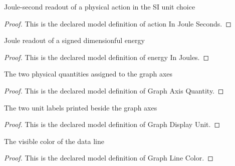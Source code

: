 \begin{definition}
  \label{def:physics:phyx-mini-0499:phyxminiproblems-problemphyxmini0499-actioninjouleseconds}
  Joule-second readout of a physical action in the SI unit choice
\end{definition}
\begin{proof}
  This is the declared model definition of action In Joule Seconds.
\end{proof}
\begin{definition}
  \label{def:physics:phyx-mini-0499:phyxminiproblems-problemphyxmini0499-energyinjoules}
  Joule readout of a signed dimensionful energy
\end{definition}
\begin{proof}
  This is the declared model definition of energy In Joules.
\end{proof}
\begin{definition}
  \label{def:physics:phyx-mini-0499:phyxminiproblems-problemphyxmini0499-graphaxisquantity}
  The two physical quantities assigned to the graph axes
\end{definition}
\begin{proof}
  This is the declared model definition of Graph Axis Quantity.
\end{proof}
\begin{definition}
  \label{def:physics:phyx-mini-0499:phyxminiproblems-problemphyxmini0499-graphdisplayunit}
  The two unit labels printed beside the graph axes
\end{definition}
\begin{proof}
  This is the declared model definition of Graph Display Unit.
\end{proof}
\begin{definition}
  \label{def:physics:phyx-mini-0499:phyxminiproblems-problemphyxmini0499-graphlinecolor}
  The visible color of the data line
\end{definition}
\begin{proof}
  This is the declared model definition of Graph Line Color.
\end{proof}
